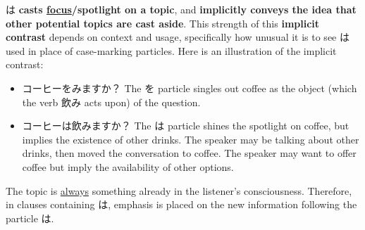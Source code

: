 \documentclass[../nihongo-gakushuu-kyouzai.tex]{subfiles}
\begin{document}
は \textbf{casts \ul{focus}/spotlight on a topic}, and \textbf{implicitly conveys the idea that other potential topics are cast aside}. This strength of this \textbf{implicit contrast} depends on context and usage, specifically how unusual it is to see は used in place of case-marking particles. Here is an illustration of the implicit contrast:
\begin{itemize}
    \item コーヒーをみますか？ The を particle singles out coffee as the object (which the verb 飲み acts upon) of the question.
    \item コーヒーは飲みますか？ The は particle shines the spotlight on coffee, but implies the existence of other drinks. The speaker may be talking about other drinks, then moved the conversation to coffee. The speaker may want to offer coffee but imply the availability of other options.
\end{itemize}

The topic is \ul{always} something already in the listener's consciousness. Therefore, in clauses containing は, emphasis is placed on the new information following the particle は.
\end{document}
